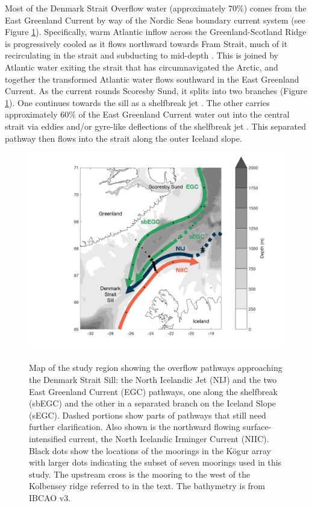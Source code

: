 \documentclass[12pt,titlepage,figuresatend]{article}
\begin{document}
Most of the Denmark Strait Overflow water (approximately 70\%) comes from the East Greenland Current by way of the Nordic Seas boundary current system \cite[]{Vage2013,Harden2016} (see Figure \ref{mainmap}). Specifically, warm Atlantic inflow across the Greenland-Scotland Ridge is progressively cooled as it flows northward towards Fram Strait, much of it recirculating in the strait and subducting to mid-depth \citep[]{Mauritzen1996}. This is joined by Atlantic water exiting the strait that has circumnavigated the Arctic, and together the transformed Atlantic water flows southward in the East Greenland Current.  As the current rounds Scoresby Sund, it splits into two branches (Figure \ref{mainmap}). One continues towards the sill as a shelfbreak jet \cite[]{Havik2017}. The other carries approximately 60\% of the East Greenland Current water out into the central strait via eddies and/or gyre-like deflections of the shelfbreak jet \cite[]{Vage2013,Harden2016}. This separated pathway then flows into the strait along the outer Iceland slope. 


\begin{figure}[p!]
  \centering\includegraphics[width=\hsize]{./figures/mainmap.pdf}
  \caption{Map of the study region showing the overflow pathways approaching the Denmark Strait Sill: the North Icelandic Jet (NIJ) and the two East Greenland Current (EGC) pathways, one along the shelfbreak (sbEGC) and the other in a separated branch on the Iceland Slope (sEGC). Dashed portions show parts of pathways that still need further clarification. Also shown is the northward flowing surface-intensified current, the North Icelandic Irminger Current (NIIC). Black dots show the locations of the moorings in the K\"{o}gur array with larger dots indicating the subset of seven moorings used in this study. The upstream cross is the mooring to the west of the Kolbensey ridge referred to in the text. The bathymetry is from IBCAO v3.}{\label{mainmap}}
\end{figure}
\end{document}
